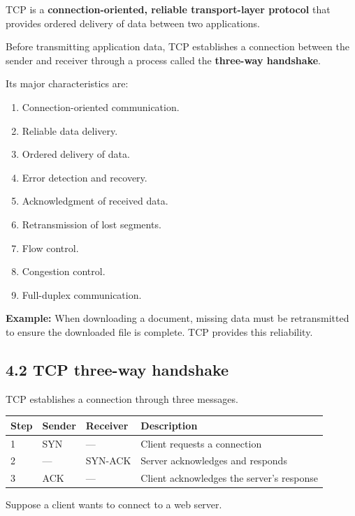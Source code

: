TCP is a \textbf{connection-oriented, reliable transport-layer protocol} that provides ordered delivery of data between two applications.

Before transmitting application data, TCP establishes a connection between the sender and receiver through a process called the \textbf{three-way handshake}.

Its major characteristics are:

\begin{enumerate}
    \item Connection-oriented communication.
    \item Reliable data delivery.
    \item Ordered delivery of data.
    \item Error detection and recovery.
    \item Acknowledgment of received data.
    \item Retransmission of lost segments.
    \item Flow control.
    \item Congestion control.
    \item Full-duplex communication.
\end{enumerate}

\textbf{Example:} When downloading a document, missing data must be retransmitted to ensure the downloaded file is complete. TCP provides this reliability.

\subsection{4.2 TCP three-way handshake}

TCP establishes a connection through three messages.

\begin{table}[htbp]
\centering
\begin{tabularx}{\textwidth}{p{3.0cm} p{3.2cm} X X}
\toprule
\textbf{Step} & \textbf{Sender} & \textbf{Receiver} & \textbf{Description} \\
\midrule
1 & SYN & — & Client requests a connection \\
2 & — & SYN-ACK & Server acknowledges and responds \\
3 & ACK & — & Client acknowledges the server's response \\
\bottomrule
\end{tabularx}
\end{table}

Suppose a client wants to connect to a web server.

